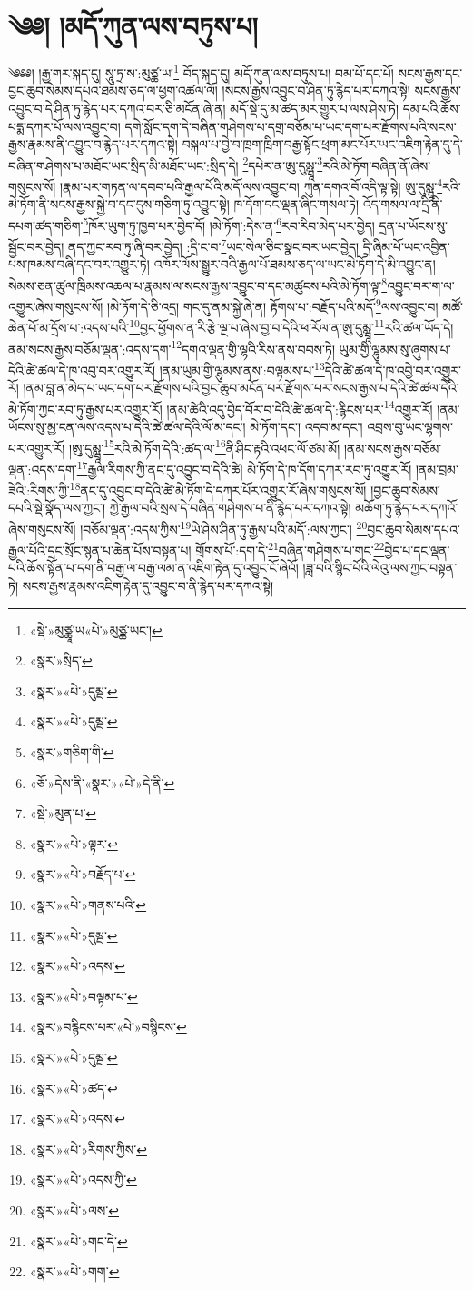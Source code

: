 \chapter{༄༅། །མདོ་ཀུན་ལས་བཏུས་པ།}༄༅༅། །རྒྱ་གར་སྐད་དུ། སཱུ་ཏྲ་ས་:མུཙྪ་ཡ།\footnote{«སྡེ་»མུཙྪཱ་ཡ«པེ་»མུཙྪ་ཡང་།} བོད་སྐད་དུ། མདོ་ཀུན་ལས་བཏུས་པ། བམ་པོ་དང་པོ། སངས་རྒྱས་དང་བྱང་ཆུབ་སེམས་དཔའ་ཐམས་ཅད་ལ་ཕྱག་འཚལ་ལོ། །སངས་རྒྱས་འབྱུང་བ་ཤིན་ཏུ་རྙེད་པར་དཀའ་སྟེ། སངས་རྒྱས་འབྱུང་བ་དེ་ཤིན་ཏུ་རྙེད་པར་དཀའ་བར་ཅི་མངོན་ཞེ་ན། མདོ་སྡེ་དུ་མ་ཚད་མར་གྱུར་པ་ལས་ཤེས་ཏེ། དམ་པའི་ཆོས་པདྨ་དཀར་པོ་ལས་འབྱུང་བ། དགེ་སློང་དག་དེ་བཞིན་གཤེགས་པ་དགྲ་བཅོམ་པ་ཡང་དག་པར་རྫོགས་པའི་སངས་རྒྱས་རྣམས་ནི་འབྱུང་བ་རྙེད་པར་དཀའ་སྟེ། བསྐལ་པ་བྱེ་བ་ཁྲག་ཁྲིག་བརྒྱ་སྟོང་ཕྲག་མང་པོར་ཡང་འཇིག་རྟེན་དུ་དེ་བཞིན་གཤེགས་པ་མཐོང་ཡང་སྲིད་མི་མཐོང་ཡང་:སྲིད་དེ། \footnote{«སྣར་»སྲིད་}དཔེར་ན་ཨུ་དུམྺཱ་\footnote{«སྣར་»«པེ་»དུམྦ་}རའི་མེ་ཏོག་བཞིན་ནོ་ཞེས་གསུངས་སོ། །རྣམ་པར་གཏན་ལ་དབབ་པའི་རྒྱལ་པོའི་མདོ་ལས་འབྱུང་བ། ཀུན་དགའ་བོ་འདི་ལྟ་སྟེ། ཨུ་དུམྺཱ་\footnote{«སྣར་»«པེ་»དུམྦ་}རའི་མེ་ཏོག་ནི་སངས་རྒྱས་སྐྱེ་བ་དང་དུས་གཅིག་ཏུ་འབྱུང་སྟེ། ཁ་དོག་དང་ལྡན་ཞིང་གསལ་ཏེ། འོད་གསལ་ལ་དྲི་ནི་དཔག་ཚད་གཅིག་\footnote{«སྣར་»གཅིག་གི་}ཁོར་ཡུག་ཏུ་ཁྱབ་པར་བྱེད་དོ། །མེ་ཏོག་:དེས་ན་\footnote{«ཅོ་»དེས་ནི་«སྣར་»«པེ་»དེ་ནི་}རབ་རིབ་མེད་པར་བྱེད། དྲན་པ་ཡོངས་སུ་སྦྱོང་བར་བྱེད། ནད་ཀྱང་རབ་ཏུ་ཞི་བར་བྱེད། :དྲི་ང་བ་\footnote{«སྡེ་»མུན་པ་}ཡང་སེལ་ཅིང་སྣང་བར་ཡང་བྱེད། དྲི་ཞིམ་པོ་ཡང་འབྱིན་པས་ཁམས་བཞི་དང་བར་འགྱུར་ཏེ། འཁོར་ལོས་སྒྱུར་བའི་རྒྱལ་པོ་ཐམས་ཅད་ལ་ཡང་མེ་ཏོག་དེ་མི་འབྱུང་ན། སེམས་ཅན་ཚུལ་ཁྲིམས་འཆལ་པ་རྣམས་ལ་སངས་རྒྱས་འབྱུང་བ་དང་མཚུངས་པའི་མེ་ཏོག་ལྟ་\footnote{«སྣར་»«པེ་»ལྟར་}འབྱུང་བར་ག་ལ་འགྱུར་ཞེས་གསུངས་སོ། །མེ་ཏོག་དེ་ཅི་འདྲ། གང་དུ་ནམ་སྐྱེ་ཞེ་ན། རྟོགས་པ་:བརྗོད་པའི་མདོ་\footnote{«སྣར་»«པེ་»བརྗོད་པ་}ལས་འབྱུང་བ། མཚོ་ཆེན་པོ་མ་དྲོས་པ་:འདས་པའི་\footnote{«སྣར་»«པེ་»གནས་པའི་}བྱང་ཕྱོགས་ན་རི་རྩེ་ལྔ་པ་ཞེས་བྱ་བ་དེའི་ཕ་རོལ་ན་ཨུ་དུམྺཱ་\footnote{«སྣར་»«པེ་»དུམྦ་}རའི་ཚལ་ཡོད་དེ། ནམ་སངས་རྒྱས་བཅོམ་ལྡན་:འདས་དག་\footnote{«སྣར་»«པེ་»འདས་}དགའ་ལྡན་གྱི་ལྷའི་རིས་ནས་བབས་ཏེ། ཡུམ་གྱི་ལྷུམས་སུ་ཞུགས་པ་དེའི་ཚེ་ཚལ་དེ་ཁ་འབུ་བར་འགྱུར་རོ། །ནམ་ཡུམ་གྱི་ལྷུམས་ནས་:བལྟམས་པ་\footnote{«སྣར་»«པེ་»བལྟམ་པ་}དེའི་ཚེ་ཚལ་དེ་ཁ་འབྱེ་བར་འགྱུར་རོ། །ནམ་བླ་ན་མེད་པ་ཡང་དག་པར་རྫོགས་པའི་བྱང་ཆུབ་མངོན་པར་རྫོགས་པར་སངས་རྒྱས་པ་དེའི་ཚེ་ཚལ་དེའི་མེ་ཏོག་ཀྱང་རབ་ཏུ་རྒྱས་པར་འགྱུར་རོ། །ནམ་ཚེའི་འདུ་བྱེད་བོར་བ་དེའི་ཚེ་ཚལ་དེ་:རྙིངས་པར་\footnote{«སྣར་»བརྙིངས་པར་«པེ་»བསྙིངས་}འགྱུར་རོ། །ནམ་ཡོངས་སུ་མྱ་ངན་ལས་འདས་པ་དེའི་ཚེ་ཚལ་དེའི་ལོ་མ་དང་། མེ་ཏོག་དང་། འདབ་མ་དང་། འབྲས་བུ་ཡང་ལྷགས་པར་འགྱུར་རོ། །ཨུ་དུམྺཱ་\footnote{«སྣར་»«པེ་»དུམྦ་}རའི་མེ་ཏོག་དེའི་:ཚད་ལ་\footnote{«སྣར་»«པེ་»ཚད་}ནི་ཤིང་རྟའི་འཕང་ལོ་ཙམ་མོ། །ནམ་སངས་རྒྱས་བཅོམ་ལྡན་:འདས་དག་\footnote{«སྣར་»«པེ་»འདས་}རྒྱལ་རིགས་ཀྱི་ནང་དུ་འབྱུང་བ་དེའི་ཚེ། མེ་ཏོག་དེ་ཁ་དོག་དཀར་རབ་ཏུ་འགྱུར་རོ། །ནམ་བྲམ་ཟེའི་:རིགས་ཀྱི་\footnote{«སྣར་»«པེ་»རིགས་ཀྱིས་}ནང་དུ་འབྱུང་བ་དེའི་ཚེ་མེ་ཏོག་དེ་དཀར་པོར་འགྱུར་རོ་ཞེས་གསུངས་སོ། །བྱང་ཆུབ་སེམས་དཔའི་སྡེ་སྣོད་ལས་ཀྱང་། ཀྱེ་རྒྱལ་བའི་སྲས་དེ་བཞིན་གཤེགས་པ་ནི་རྙེད་པར་དཀའ་སྟེ། མཆོག་ཏུ་རྙེད་པར་དཀའོ་ཞེས་གསུངས་སོ། །བཅོམ་ལྡན་:འདས་ཀྱིས་\footnote{«སྣར་»«པེ་»འདས་ཀྱི་}ཡེ་ཤེས་ཤིན་ཏུ་རྒྱས་པའི་མདོ་:ལས་ཀྱང་། \footnote{«སྣར་»«པེ་»ལས་}བྱང་ཆུབ་སེམས་དཔའ་རྒྱལ་པོའི་དྲང་སྲོང་སྙན་པ་ཆེན་པོས་བསྟན་པ། གྲོགས་པོ་:དག་དེ་\footnote{«སྣར་»«པེ་»གང་དེ་}བཞིན་གཤེགས་པ་གང་\footnote{«སྣར་»«པེ་»གག་}བྱེད་པ་དང་ལྡན་པའི་ཆོས་སྟོན་པ་དག་ནི་བརྒྱ་ལ་བརྒྱ་ལམ་ན་འཇིག་རྟེན་དུ་འབྱུང་ངོ་ཞེའོ། །ཟླ་བའི་སྙིང་པོའི་ལེའུ་ལས་ཀྱང་བསྟན་ཏེ། སངས་རྒྱས་རྣམས་འཇིག་རྟེན་དུ་འབྱུང་བ་ནི་རྙེད་པར་དཀའ་སྟེ། 
